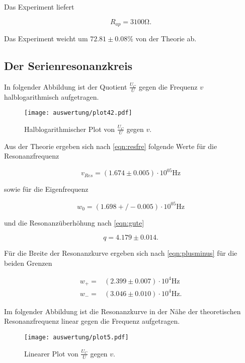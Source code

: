 Das Experiment liefert

\begin{equation}
  R_{ap} = 3100 \si{\ohm}.
  \label{eqn:rapausw2}
\end{equation}

Das Experiment weicht um $72.81 \pm 0.08 \si{\percent}$ von der Theorie ab.

\subsection{Der Serienresonanzkreis}

In folgender Abbildung ist der Quotient $\frac{U_C}{U}$ gegen die Frequenz $v$ halblogarithmisch aufgetragen.

\begin{figure}[H]
  \centering
  \texttt{[image: auswertung/plot42.pdf]}
  \caption{Halblogarithmischer Plot von $\frac{U_C}{U}$ gegen $v$.}
  \label{fig:halbloga}
\end{figure}

Aus der Theorie ergeben sich nach \eqref{eqn:resfre} folgende Werte für die Resonanzfrequenz

\begin{equation}
  v_{Res} = (1.674 \pm 0.005)\cdot 10^05 \si{\hertz}
  \label{eqn:vresausw}
\end{equation}

sowie für die Eigenfrequenz

\begin{equation}
  w_0 = (1.698+/-0.005)\cdot 10^05 \si{\hertz}
  \label{eqn:w0ausw}
\end{equation}

und die Resonanzüberhöhung nach \eqref{eqn:gute}

\begin{equation}
  q = 4.179 \pm 0.014.
  \label{eqn:qausw}
\end{equation}

Für die Breite der Resonanzkurve ergeben sich nach \eqref{eqn:plusminus} für die beiden Grenzen

\begin{align}
  w_+ = & (2.399 \pm 0.007) \cdot 10^4 \si{\hertz} \\
  w_- = & (3.046 \pm 0.010) \cdot 10^4 \si{\hertz}.
  \label{eqn:plusminusausw}
\end{align}

Im folgender Abbildung ist die Resonanzkurve in der Nähe der theoretischen Resonanzfrequenz linear
gegen die Frequenz aufgetragen. 

\begin{figure}[H]
  \centering
  \texttt{[image: auswertung/plot5.pdf]}
  \caption{Linearer Plot von $\frac{U_C}{U}$ gegen $v$.}
  \label{fig:halbloga}
\end{figure}

